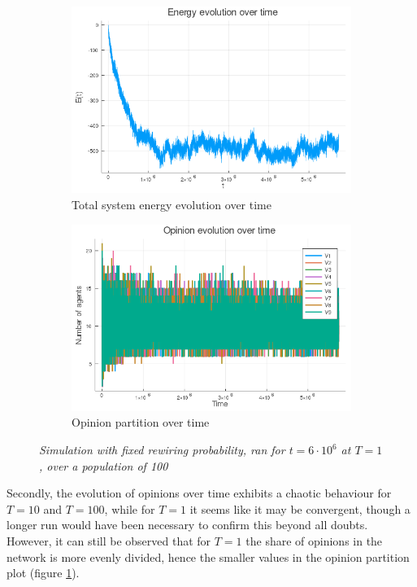 \documentclass[12pt,openright,twoside]{book}
\begin{document}
\begin{figure}[!htb]
\centering
\begin{subfigure}{0.47\linewidth}
    \includegraphics[width=\linewidth]{figures/2_2_t1/energy_evolution.png}
    \caption{Total system energy evolution over time}
\end{subfigure}
\begin{subfigure}{0.47\linewidth}
    \includegraphics[width=\linewidth]{figures/2_2_t1/vote_evolution.png}
    \caption{Opinion partition over time}
\end{subfigure}
\caption{\textit{{\small Simulation with fixed rewiring probability, ran for $t=6\cdot 10^6$ at $T=1$, over a population of 100}}}
\label{2_2_t1:ener_inne}
\end{figure}

Secondly, the evolution of opinions over time exhibits a chaotic behaviour for $T=10$ and $T=100$, while for $T=1$ it seems like it may be convergent, though a longer run would have been necessary to confirm this beyond all doubts. However, it can still be observed that for $T=1$ the share of opinions in the network is more evenly divided, hence the smaller values in the opinion partition plot (figure \ref{2_2_t1:ener_inne}).\\
\end{document}

